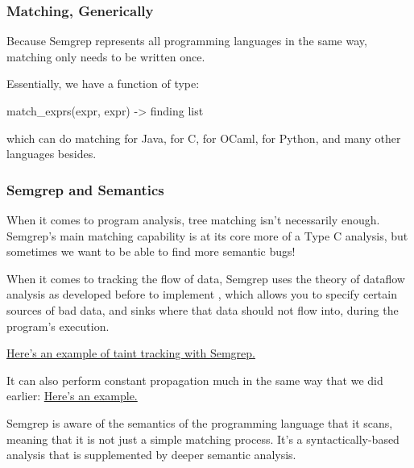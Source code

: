 \documentclass[aspectratio=169, handout]{beamer}
\begin{document}
 \begin{frame}[fragile]
   \frametitle{Matching, Generically}

   Because Semgrep represents all programming languages in the same way,
   matching only needs to be written once.

   \pause
   \vspace{\fill}
   Essentially, we have a function of type:
   \begin{codeblock}
     match_exprs(expr, expr) -> finding list
   \end{codeblock}

   which can do matching for Java, for C, for OCaml, for Python, and many
   other languages besides.
 \end{frame}

 \begin{frame}[fragile]
   \frametitle{Semgrep and Semantics}

   When it comes to program analysis, tree matching isn't necessarily enough.
   Semgrep's main matching capability is at its core more of a Type C analysis,
   but sometimes we want to be able to find more semantic bugs!

   \pause
   \vspace{\fill}

   When it comes to tracking the flow of data, Semgrep uses the theory of
   dataflow analysis as developed before to implement ,
   which allows you to specify certain sources of bad data, and sinks where that
   data should not flow into, during the program's execution.

   {\color{blue}\href{https://semgrep.dev/playground/s/D1wq}{Here's an example of taint tracking with Semgrep.}}

   \pause
   \vspace{\fill}

   It can also perform constant propagation much in the same way that we did
   earlier:
   {\color{blue}\href{https://semgrep.dev/playground/s/4APL}{Here's an example.}}

   \pause
   \vspace{\fill}

   Semgrep is aware of the semantics of the programming language that it scans,
   meaning that it is not just a simple matching process. It's a
   syntactically-based analysis that is supplemented by deeper semantic analysis.
 \end{frame}

\end{document}
